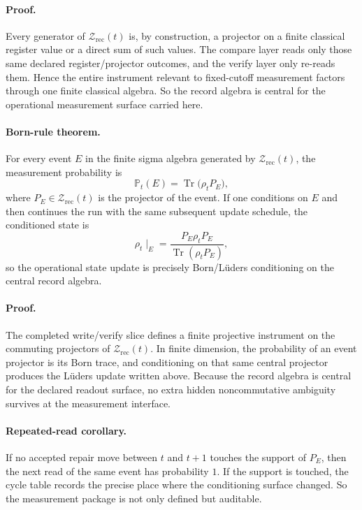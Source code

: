 \documentclass[11pt]{article}
\begin{document}
\paragraph{Proof.}
Every generator of $\mathcal Z_{\mathrm{rec}}(t)$ is, by construction, a projector on a finite
classical register value or a direct sum of such values. The compare layer reads only those same
declared register/projector outcomes, and the verify layer only re-reads them. Hence the entire
instrument relevant to fixed-cutoff measurement factors through one finite classical algebra. So
the record algebra is central for the operational measurement surface carried here.

\paragraph{Born-rule theorem.}
For every event $E$ in the finite sigma algebra generated by $\mathcal Z_{\mathrm{rec}}(t)$, the
measurement probability is
\begin{equation}
\mathbb P_t(E)=\operatorname{Tr}\!\bigl(\rho_t P_E\bigr),
\end{equation}
where $P_E\in\mathcal Z_{\mathrm{rec}}(t)$ is the projector of the event. If one conditions on
$E$ and then continues the run with the same subsequent update schedule, the conditioned state is
\begin{equation}
\rho_t\!\mid_E
=
\frac{P_E\rho_t P_E}{\operatorname{Tr}(\rho_t P_E)},
\end{equation}
so the operational state update is precisely Born/L\"uders conditioning on the central record
algebra.

\paragraph{Proof.}
The completed write/verify slice defines a finite projective instrument on the commuting
projectors of $\mathcal Z_{\mathrm{rec}}(t)$. In finite dimension, the probability of an event
projector is its Born trace, and conditioning on that same central projector produces the
L\"uders update written above. Because the record algebra is central for the declared readout
surface, no extra hidden noncommutative ambiguity survives at the measurement interface.

\paragraph{Repeated-read corollary.}
If no accepted repair move between $t$ and $t+1$ touches the support of $P_E$, then the next
read of the same event has probability $1$. If the support is touched, the cycle table records
the precise place where the conditioning surface changed. So the measurement package is not only
defined but auditable.
\end{document}
